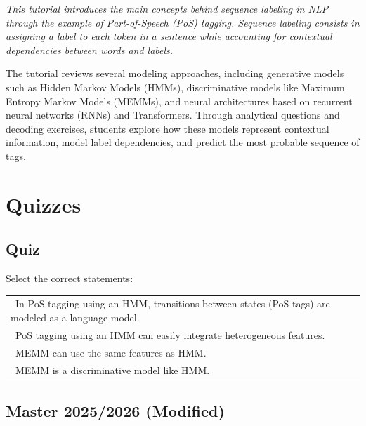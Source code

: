 \documentclass{../extra/aakpract/aakpract}
\begin{document}
	
	\maketitle
	
	\begin{center}
		\begin{minipage}{0.85\textwidth}
			\small\itshape
			This tutorial introduces the main concepts behind sequence labeling in NLP through the example of Part-of-Speech (PoS) tagging. 
			Sequence labeling consists in assigning a label to each token in a sentence while accounting for contextual dependencies between words and labels.
			
			\vspace{6pt}
			The tutorial reviews several modeling approaches, including generative models such as Hidden Markov Models (HMMs), discriminative models like Maximum Entropy Markov Models (MEMMs), and neural architectures based on recurrent neural networks (RNNs) and Transformers. 
			Through analytical questions and decoding exercises, students explore how these models represent contextual information, model label dependencies, and predict the most probable sequence of tags.
			
		\end{minipage}
	\end{center}
	
	
	\section{Quizzes}
	
	\subsection{Quiz}
	
	Select the correct statements:
	
	\begin{longtable}{|p{}|}
		\hline 
		\Square\ In PoS tagging using an HMM, transitions between states (PoS tags) are modeled as a language model. \\
		\Square\ PoS tagging using an HMM can easily integrate heterogeneous features. \\	
		\Square\ MEMM can use the same features as HMM. \\
		\Square\ MEMM is a discriminative model like HMM. \\
		\hline
	\end{longtable}
	
	
	\subsection{Master 2025/2026 (Modified)}
	
\end{document}
